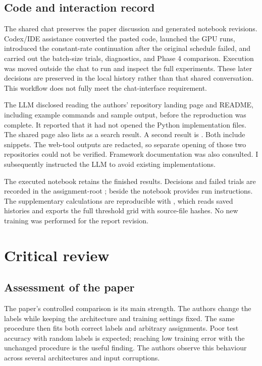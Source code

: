 \documentclass[11pt]{article}
\begin{document}
\subsection{Code and interaction record}

The shared chat preserves the paper discussion and generated notebook revisions. Codex/IDE assistance converted the pasted code, launched the GPU runs, introduced the constant-rate continuation after the original schedule failed, and carried out the batch-size trials, diagnostics, and Phase 4 comparison. Execution was moved outside the chat to run and inspect the full experiments. These later decisions are preserved in the local history rather than that shared conversation. This workflow does not fully meet the chat-interface requirement.

The LLM disclosed reading the authors' repository landing page and README, including example commands and sample output, before the reproduction was complete. It reported that it had not opened the Python implementation files. The shared page also lists  as a search result. A second result is . Both include snippets. The web-tool outputs are redacted, so separate opening of those two repositories could not be verified. Framework documentation was also consulted. I subsequently instructed the LLM to avoid existing implementations.

The executed notebook retains the finished results. Decisions and failed trials are recorded in the assignment-root ;  beside the notebook provides run instructions. The supplementary calculations are reproducible with , which reads saved histories and exports the full threshold grid with source-file hashes. No new training was performed for the report revision.

\clearpage
\section{Critical review}

\subsection{Assessment of the paper}

The paper's controlled comparison is its main strength. The authors change the labels while keeping the architecture and training settings fixed. The same procedure then fits both correct labels and arbitrary assignments. Poor test accuracy with random labels is expected; reaching low training error with the unchanged procedure is the useful finding. The authors observe this behaviour across several architectures and input corruptions.
\end{document}
